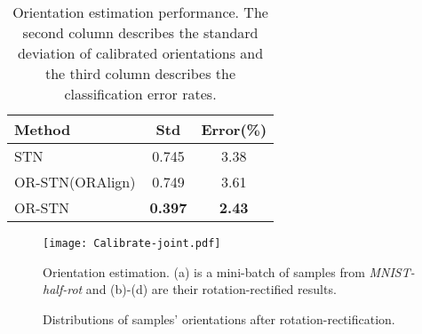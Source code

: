 \documentclass[10pt,twocolumn,letterpaper]{article}
\begin{document}
    \begin{table}
        \begin{center}
            \begin{tabular}{|l|c|c|}
                \hline
                Method              & Std & Error(\%)       \\ \hline\hline
                STN \cite{Jaderberg2015}  & 0.745    & 3.38 \\
                OR-STN(ORAlign)     & 0.749 & 3.61          \\
                OR-STN        & \textbf{0.397} & \textbf{2.43} \\ \hline
            \end{tabular}
        \end{center}
        \caption{
            Orientation estimation performance. The second column describes the standard deviation of calibrated orientations and the third column describes the classification error rates.
        }
    \label{tab:MNIST-orientation-estimate}
    \vspace{-0.2em}
    \end{table}

    \begin{figure}
        \centering
        \texttt{[image: Calibrate-joint.pdf]}
        \caption{Orientation estimation. (a) is a mini-batch of samples from \textit{MNIST-half-rot} and (b)-(d) are their rotation-rectified results.}
    \label{fig:Estimation}
    \vspace{-1em}
    \end{figure}

    \begin{figure*}[t]
        \centering
        \caption{Distributions of samples' orientations after rotation-rectification.}
    \label{fig:Distribution}
    \vspace{-0.4em}
    \end{figure*}
\end{document}

